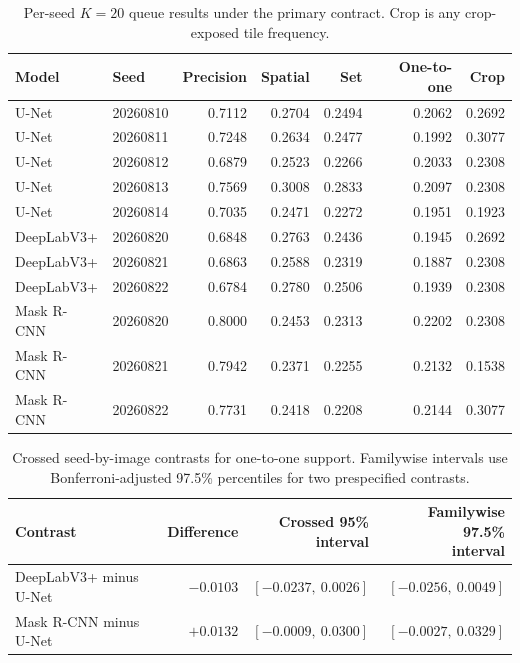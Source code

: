 \documentclass[preprint,12pt]{elsarticle}
\begin{document}
\begin{table}[htbp]
\centering
\caption{Per-seed $K=20$ queue results under the primary contract. Crop is any crop-exposed tile frequency.}
\label{tab:s7seeds}
\footnotesize
\setlength{\tabcolsep}{4pt}
\begin{tabular}{llrrrrr}
\toprule
Model & Seed & Precision & Spatial & Set & One-to-one & Crop \\
\midrule
U-Net & 20260810 & 0.7112 & 0.2704 & 0.2494 & 0.2062 & 0.2692 \\
U-Net & 20260811 & 0.7248 & 0.2634 & 0.2477 & 0.1992 & 0.3077 \\
U-Net & 20260812 & 0.6879 & 0.2523 & 0.2266 & 0.2033 & 0.2308 \\
U-Net & 20260813 & 0.7569 & 0.3008 & 0.2833 & 0.2097 & 0.2308 \\
U-Net & 20260814 & 0.7035 & 0.2471 & 0.2272 & 0.1951 & 0.1923 \\
\midrule
DeepLabV3+ & 20260820 & 0.6848 & 0.2763 & 0.2436 & 0.1945 & 0.2692 \\
DeepLabV3+ & 20260821 & 0.6863 & 0.2588 & 0.2319 & 0.1887 & 0.2308 \\
DeepLabV3+ & 20260822 & 0.6784 & 0.2780 & 0.2506 & 0.1939 & 0.2308 \\
\midrule
Mask R-CNN & 20260820 & 0.8000 & 0.2453 & 0.2313 & 0.2202 & 0.2308 \\
Mask R-CNN & 20260821 & 0.7942 & 0.2371 & 0.2255 & 0.2132 & 0.1538 \\
Mask R-CNN & 20260822 & 0.7731 & 0.2418 & 0.2208 & 0.2144 & 0.3077 \\
\bottomrule
\end{tabular}
\end{table}

\begin{table}[htbp]
\centering
\caption{Crossed seed-by-image contrasts for one-to-one support. Familywise intervals use Bonferroni-adjusted 97.5\% percentiles for two prespecified contrasts.}
\label{tab:s7crossed}
\footnotesize
\setlength{\tabcolsep}{4pt}
\begin{tabular}{lrrr}
\toprule
Contrast & Difference & \shortstack{Crossed 95\%\\interval} & \shortstack{Familywise 97.5\%\\interval} \\
\midrule
DeepLabV3+ minus U-Net & $-0.0103$ & $[-0.0237,\ 0.0026]$ & $[-0.0256,\ 0.0049]$ \\
Mask R-CNN minus U-Net & $+0.0132$ & $[-0.0009,\ 0.0300]$ & $[-0.0027,\ 0.0329]$ \\
\bottomrule
\end{tabular}
\end{table}
\end{document}
